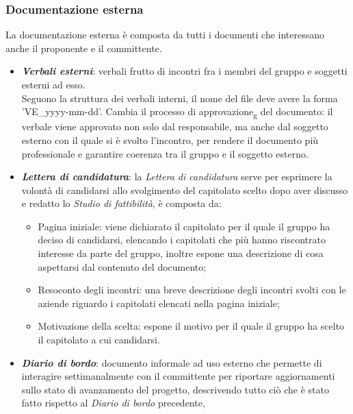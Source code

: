 \subsubsection{Documentazione esterna}
La documentazione esterna è composta da tutti i documenti che interessano anche
il proponente e il committente.
\begin{itemize}
      \item \textit{\textbf{Verbali esterni}}: verbali frutto di incontri fra i membri del gruppo e soggetti esterni ad esso.\\
            Seguono la struttura dei verbali interni, il nome del file deve avere la forma 'VE\_yyyy-mm-dd'. Cambia il processo di approvazione\textsubscript{g} del documento:
            il verbale viene approvato non solo dal responsabile, ma anche dal soggetto esterno con il quale si è svolto l'incontro,
            per rendere il documento più professionale e garantire coerenza tra il gruppo e il soggetto esterno.
      \item \textit{\textbf{Lettera di candidatura}}: la \textit{Lettera di candidatura} serve per esprimere la volontà di candidarsi allo svolgimento del capitolato scelto dopo aver discusso e redatto lo \textit{Studio di fattibilità},
            è composta da:
            \begin{itemize}
                  \item Pagina iniziale: viene dichiarato il capitolato per il quale il gruppo ha
                        deciso di candidarsi, elencando i capitolati che più hanno riscontrato
                        interesse da parte del gruppo, inoltre espone una descrizione di cosa
                        aspettarsi dal contenuto del documento;
                  \item Resoconto degli incontri: una breve descrizione degli incontri svolti con le
                        aziende riguardo i capitolati elencati nella pagina iniziale;
                  \item Motivazione della scelta: espone il motivo per il quale il gruppo ha scelto il
                        capitolato a cui candidarsi.
            \end{itemize}
      \item \textit{\textbf{Diario di bordo}}: documento informale ad uso esterno che permette di interagire settimanalmente con il committente per riportare aggiornamenti sullo stato di
            avanzamento del progetto, descrivendo tutto ciò che è stato fatto rispetto al \textit{Diario di bordo} precedente,

\end{itemize}
